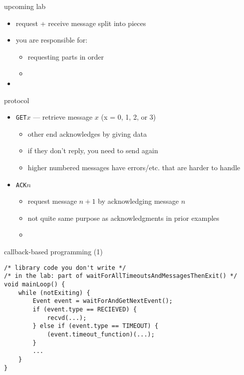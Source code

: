 \begin{frame}{upcoming lab}
    \begin{itemize}
    \item request + receive message split into pieces
    \item you are responsible for:
        \begin{itemize}
        \item requesting parts in order
        \item {}
        \end{itemize}
    \item {}
    \end{itemize}
\end{frame}

\begin{frame}{protocol}
    \begin{itemize}
    \item {\tt GET$x$} --- retrieve message $x$ (x = 0, 1, 2, or 3)
        \begin{itemize}
        \item other end acknowledges by giving data
        \item if they don't reply, you need to send again
        \item higher numbered messages have errors/etc. that are harder to handle
        \end{itemize}
    \item {\tt ACK$n$ }
        \begin{itemize}
        \item request message $n + 1$ by acknowledging message $n$
        \item not quite same purpose as acknowledgments in prior examples
        \item {} \\
        \end{itemize}
    \end{itemize}
\end{frame}


\begin{frame}[fragile]{callback-based programming (1)}
\begin{Verbatim}[fontsize=\small]
/* library code you don't write */
/* in the lab: part of waitForAllTimeoutsAndMessagesThenExit() */
void mainLoop() {
    while (notExiting) {
        Event event = waitForAndGetNextEvent();
        if (event.type == RECIEVED) {
            recvd(...);
        } else if (event.type == TIMEOUT) {
            (event.timeout_function)(...);
        }
        ...
    }
}
\end{Verbatim}
\end{frame}


